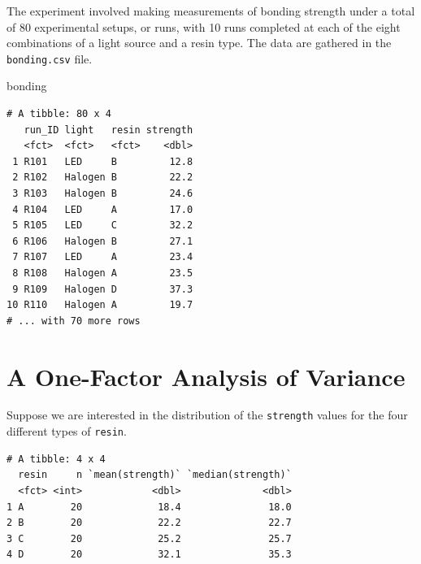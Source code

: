 \documentclass[]{book}
\newenvironment{Shaded}{\begin{snugshade}}{\end{snugshade}}
\newcommand{\KeywordTok}[1]{\textcolor[rgb]{0.13,0.29,0.53}{\textbf{#1}}}
\newcommand{\DataTypeTok}[1]{\textcolor[rgb]{0.13,0.29,0.53}{#1}}
\newcommand{\StringTok}[1]{\textcolor[rgb]{0.31,0.60,0.02}{#1}}
\newcommand{\OperatorTok}[1]{\textcolor[rgb]{0.81,0.36,0.00}{\textbf{#1}}}
\newcommand{\NormalTok}[1]{#1}
\theoremstyle{definition}
\theoremstyle{definition}
\theoremstyle{definition}
\theoremstyle{remark}
\begin{document}
The experiment involved making measurements of bonding strength under a
total of 80 experimental setups, or runs, with 10 runs completed at each
of the eight combinations of a light source and a resin type. The data
are gathered in the \texttt{bonding.csv} file.

\begin{Shaded}
\begin{Highlighting}[]
\NormalTok{bonding}
\end{Highlighting}
\end{Shaded}

\begin{verbatim}
# A tibble: 80 x 4
   run_ID light   resin strength
   <fct>  <fct>   <fct>    <dbl>
 1 R101   LED     B         12.8
 2 R102   Halogen B         22.2
 3 R103   Halogen B         24.6
 4 R104   LED     A         17.0
 5 R105   LED     C         32.2
 6 R106   Halogen B         27.1
 7 R107   LED     A         23.4
 8 R108   Halogen A         23.5
 9 R109   Halogen D         37.3
10 R110   Halogen A         19.7
# ... with 70 more rows
\end{verbatim}

\section{A One-Factor Analysis of
Variance}\label{a-one-factor-analysis-of-variance}

Suppose we are interested in the distribution of the \texttt{strength}
values for the four different types of \texttt{resin}.

\begin{Shaded}
\end{Shaded}

\begin{verbatim}
# A tibble: 4 x 4
  resin     n `mean(strength)` `median(strength)`
  <fct> <int>            <dbl>              <dbl>
1 A        20             18.4               18.0
2 B        20             22.2               22.7
3 C        20             25.2               25.7
4 D        20             32.1               35.3
\end{verbatim}
\end{document}
